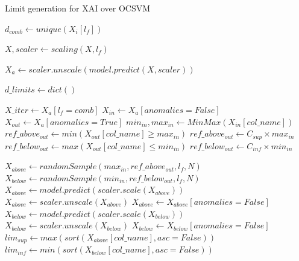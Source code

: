 \begin{algorithm}[]
\caption{Limit generation for XAI over OCSVM}\label{alg:ch5-ocsvm-comms-limits}
\begin{algorithmic}[1]

    \State $d_{comb} \gets unique(X_i[l_f])$
    
    \State $X, scaler \gets scaling(X, l_f)$
    
    \State $X_{a} \gets scaler.unscale(model.predict(X, scaler))$ 
    
    \State $d\_limits \gets dict()$
    
        \State $X\_iter \gets X_{a}[l_f = comb]$
        \State $X_{in} \gets X_{a}[anomalies = False]$ 
        \State $X_{out} \gets X_{a}[anomalies = True]$ 
        \State $min_{in}, max_{in} \gets MinMax(X_{in}[col\_name])$
        \State $ref\_above_{out} \gets min(X_{out}[col\_name] \geq max_{in})$
            \State $ref\_above_{out} \gets C_{sup} \times max_{in}$
        \EndIf
        \State $ref\_below_{out} \gets max(X_{out}[col\_name] \leq min_{in})$
            \State $ref\_below_{out} \gets C_{inf} \times min_{in}$
        \EndIf
        
        \State $X_{above} \gets randomSample(max_{in}, ref\_above_{out}, l_f, N)$
        \State $X_{below} \gets randomSample(min_{in}, ref\_below_{out}, l_f, N)$
        \State
        \State $X_{above} \gets model.predict(scaler.scale(X_{above}))$
        \State $X_{above} \gets scaler.unscale(X_{above})$
        \State $X_{above} \gets X_{above}[anomalies = False]$
        \State $X_{below} \gets model.predict(scaler.scale(X_{below}))$
        \State $X_{below} \gets scaler.unscale(X_{below})$
        \State $X_{below} \gets X_{below}[anomalies = False]$
        \State
            \State $lim_{sup} \gets max(sort(X_{above}[col\_name], asc=False))$
            \State $lim_{inf} \gets min(sort(X_{below}[col\_name], asc=False))$
        

\end{algorithmic}
\end{algorithm}
